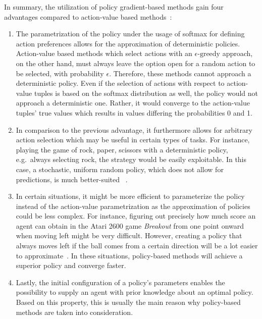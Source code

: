 \documentclass[draft,final]{vutinfth} %
\newcommand{\p}[1]{see p. #1}
\begin{document}
    In summary, the utilization of policy gradient-based methods gain four advantages compared to action-value based methods~\citep[\p{322f}]{sutton_reinforcement_2018}:

    \begin{enumerate}
        \item The parametrization of the policy under the usage of softmax for defining action preferences allows for the approximation of deterministic policies.
        Action-value based methods which select actions with an $\epsilon\text{-greedy}$ approach, on the other hand, must always leave the option open for a random action to be selected, with probability $\epsilon$.
        Therefore, these methods cannot approach a deterministic policy.
        Even if the selection of actions with respect to action-value tuples is based on the softmax distribution as well, the policy would not approach a deterministic one.
        Rather, it would converge to the action-value tuples' true values which results in values differing the probabilities 0 and 1.
        \item In comparison to the previous advantage, it furthermore allows for arbitrary action selection which may be useful in certain types of tasks.
        For instance, playing the game of rock, paper, scissors with a deterministic policy, e.g.\ always selecting rock, the strategy would be easily exploitable.
        In this case, a stochastic, uniform random policy, which does not allow for predictions, is much better-suited ~.
        \item In certain situations, it might be more efficient to parameterize the policy instead of the action-value parametrization as the approximation of policies could be less complex.
        For instance, figuring out precisely how much score an agent can obtain in the Atari 2600 game \textit{Breakout} from one point onward when moving left might be very difficult.
        However, creating a policy that always moves left if the ball comes from a certain direction will be a lot easier to approximate~.
        In these situations, policy-based methods will achieve a superior policy and converge faster\citep[\p{323}]{sutton_reinforcement_2018}.
        \item Lastly, the initial configuration of a policy's parameters enables the possibility to supply an agent with prior knowledge about an optimal policy.
        Based on this property, this is usually the main reason why policy-based methods are taken into consideration.
    \end{enumerate}
\end{document}
